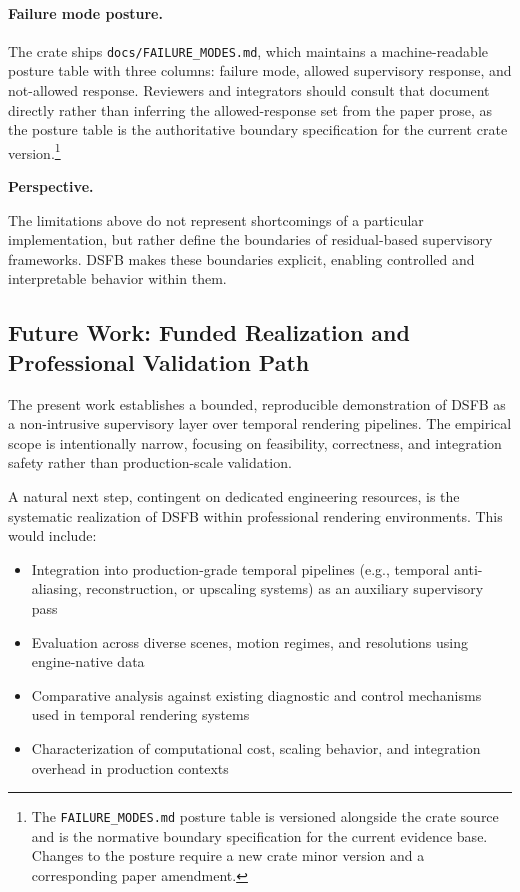 \documentclass[11pt,letterpaper]{article}
\theoremstyle{gcresult}
\theoremstyle{definition}
\begin{document}
\paragraph{Failure mode posture.}
The crate ships \texttt{docs/FAILURE\_MODES.md}, which maintains a machine-readable posture table with three columns: failure mode, allowed supervisory response, and not-allowed response. Reviewers and integrators should consult that document directly rather than inferring the allowed-response set from the paper prose, as the posture table is the authoritative boundary specification for the current crate version.\footnote{The \texttt{FAILURE\_MODES.md} posture table is versioned alongside the crate source and is the normative boundary specification for the current evidence base. Changes to the posture require a new crate minor version and a corresponding paper amendment.}

\vspace{0.5em}
\noindent
\textbf{Perspective.}

The limitations above do not represent shortcomings of a particular implementation, but rather define the boundaries of residual-based supervisory frameworks. DSFB makes these boundaries explicit, enabling controlled and interpretable behavior within them.


\subsection{Future Work: Funded Realization and Professional Validation Path}

The present work establishes a bounded, reproducible demonstration of DSFB as a non-intrusive supervisory layer over temporal rendering pipelines. The empirical scope is intentionally narrow, focusing on feasibility, correctness, and integration safety rather than production-scale validation.

A natural next step, contingent on dedicated engineering resources, is the systematic realization of DSFB within professional rendering environments. This would include:

\begin{itemize}
    \item Integration into production-grade temporal pipelines (e.g., temporal anti-aliasing, reconstruction, or upscaling systems) as an auxiliary supervisory pass
    \item Evaluation across diverse scenes, motion regimes, and resolutions using engine-native data
    \item Comparative analysis against existing diagnostic and control mechanisms used in temporal rendering systems
    \item Characterization of computational cost, scaling behavior, and integration overhead in production contexts
\end{itemize}
\end{document}
